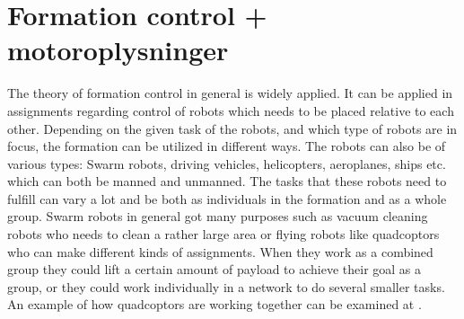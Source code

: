 \section{Formation control + motoroplysninger}
%
The theory of formation control in general is widely applied. It can be applied in assignments regarding control of robots which needs to be placed relative to each other. Depending on the given task of the robots, and which type of robots are in focus, the formation can be utilized in different ways. The robots can also be of various types: Swarm robots, driving vehicles, helicopters, aeroplanes, ships etc. which can both be manned and unmanned. The tasks that these robots need to fulfill can vary a lot and be both as individuals in the formation and as a whole group. Swarm robots in general got many purposes such as vacuum cleaning robots who needs to clean a rather large area or flying robots like quadcoptors who can make different kinds of assignments. When they work as a combined group they could lift a certain amount of payload to achieve their goal as a group, or they could work individually in a network to do several smaller tasks. An example of how quadcoptors are working together can be examined at \citep{ethswarm}.

